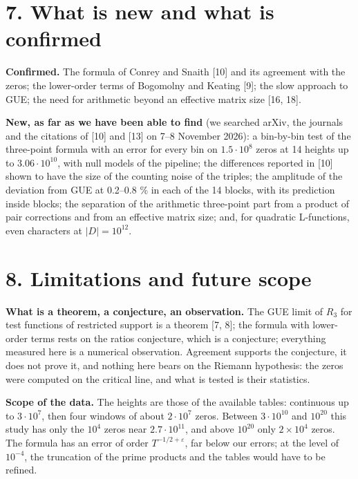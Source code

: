 \documentclass[
  10pt,
]{article}
\begin{document}
\hypertarget{what-is-new-and-what-is-confirmed}{%
\section{7. What is new and what is
confirmed}\label{what-is-new-and-what-is-confirmed}}

\textbf{Confirmed.} The formula of Conrey and Snaith {[}10{]} and its
agreement with the zeros; the lower-order terms of Bogomolny and Keating
{[}9{]}; the slow approach to GUE; the need for arithmetic beyond an
effective matrix size {[}16, 18{]}.

\textbf{New, as far as we have been able to find} (we searched arXiv,
the journals and the citations of {[}10{]} and {[}13{]} on 7--8 November
2026): a bin-by-bin test of the three-point formula with an error for
every bin on \(1.5\cdot10^8\) zeros at 14 heights up to
\(3.06\cdot10^{10}\), with null models of the pipeline; the differences
reported in {[}10{]} shown to have the size of the counting noise of the
triples; the amplitude of the deviation from GUE at 0.2--0.8 \% in each
of the 14 blocks, with its prediction inside blocks; the separation of
the arithmetic three-point part from a product of pair corrections and
from an effective matrix size; and, for quadratic L-functions, even
characters at \(|D| = 10^{12}\).

\hypertarget{limitations-and-future-scope}{%
\section{8. Limitations and future
scope}\label{limitations-and-future-scope}}

\textbf{What is a theorem, a conjecture, an observation.} The GUE limit
of \(R_3\) for test functions of restricted support is a theorem {[}7,
8{]}; the formula with lower-order terms rests on the ratios conjecture,
which is a conjecture; everything measured here is a numerical
observation. Agreement supports the conjecture, it does not prove it,
and nothing here bears on the Riemann hypothesis: the zeros were
computed on the critical line, and what is tested is their statistics.

\textbf{Scope of the data.} The heights are those of the available
tables: continuous up to \(3\cdot10^7\), then four windows of about
\(2\cdot10^7\) zeros. Between \(3\cdot10^{10}\) and \(10^{20}\) this
study has only the \(10^4\) zeros near \(2.7\cdot10^{11}\), and above
\(10^{20}\) only \(2 \times 10^4\) zeros. The formula has an error of
order \(T^{-1/2+\varepsilon}\), far below our errors; at the level of
\(10^{-4}\), the truncation of the prime products and the tables would
have to be refined.
\end{document}
